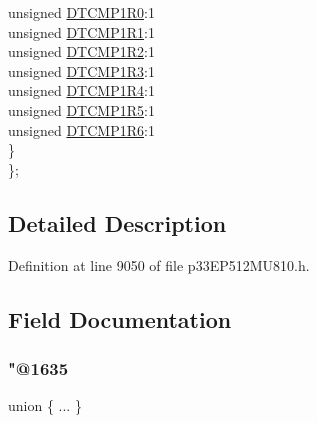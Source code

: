 \begin{DoxyCompactItemize}
\begin{tabbing}
\>\>unsigned \hyperlink{structtag_r_p_i_n_r38_b_i_t_s_afa30f28697f67b92350f248416859a3f}{DTCMP1R0}:1\\
\>\>unsigned \hyperlink{structtag_r_p_i_n_r38_b_i_t_s_af97eb82d8c74333e9e2970e9aecc3e3b}{DTCMP1R1}:1\\
\>\>unsigned \hyperlink{structtag_r_p_i_n_r38_b_i_t_s_a3d7de2f8f35baf3d1d9ba789ea324586}{DTCMP1R2}:1\\
\>\>unsigned \hyperlink{structtag_r_p_i_n_r38_b_i_t_s_aaf5e93b92ef1fac13f2906a82106cd72}{DTCMP1R3}:1\\
\>\>unsigned \hyperlink{structtag_r_p_i_n_r38_b_i_t_s_aa3bbb9f72e6237a87341f5a250f664f8}{DTCMP1R4}:1\\
\>\>unsigned \hyperlink{structtag_r_p_i_n_r38_b_i_t_s_acf7789ac51eba893170d058787843d21}{DTCMP1R5}:1\\
\>\>unsigned \hyperlink{structtag_r_p_i_n_r38_b_i_t_s_a30bb6317fa278bb9d602b745ab8778b6}{DTCMP1R6}:1\\
\>\} \\
\}; \\

\end{tabbing}\end{DoxyCompactItemize}


\subsection{Detailed Description}


Definition at line 9050 of file p33\+E\+P512\+M\+U810.\+h.



\subsection{Field Documentation}
\mbox{\label{structtag_r_p_i_n_r38_b_i_t_s_ad33c0cec22429f525387b4958e05fe58}} 
\subsubsection{\texorpdfstring{"@1635}{@1635}}
{\footnotesize\ttfamily union \{ ... \} }

\mbox{\label{structtag_r_p_i_n_r38_b_i_t_s_adf71f3d8410c1f1dbbc96680a92c49af}} 
